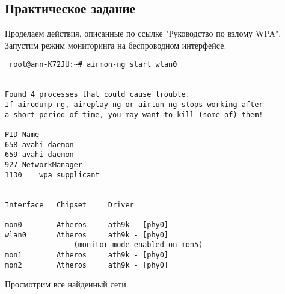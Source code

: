 \documentclass[10pt,a4paper]{report}
\begin{document}
\subsection{Практическое задание}
Проделаем действия, описанные по ссылке "Руководство по взлому WPA". \\
Запустим режим мониторинга на беспроводном интерфейсе.
\begin{verbatim}
 root@ann-K72JU:~# airmon-ng start wlan0


Found 4 processes that could cause trouble.
If airodump-ng, aireplay-ng or airtun-ng stops working after
a short period of time, you may want to kill (some of) them!

PID	Name
658	avahi-daemon
659	avahi-daemon
927	NetworkManager
1130	wpa_supplicant


Interface	Chipset		Driver

mon0		Atheros 	ath9k - [phy0]
wlan0		Atheros 	ath9k - [phy0]
				(monitor mode enabled on mon5)
mon1		Atheros 	ath9k - [phy0]
mon2		Atheros 	ath9k - [phy0]
\end{verbatim}
Просмотрим все найденный сети.
\end{document}
